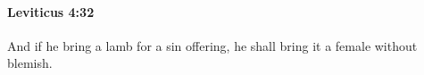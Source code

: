 
		\paragraph{Leviticus 4:32} %
			\label{LEVITICUS-4-32}

			And if he bring a lamb for a sin offering, he shall bring it a female without blemish.


